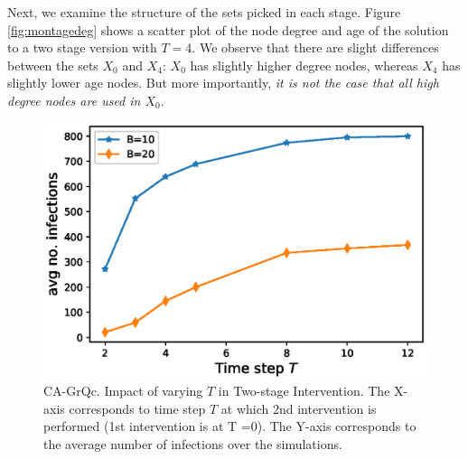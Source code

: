 Next, we examine the structure of the sets picked in each stage. Figure \ref{fig:montagedeg} shows a scatter plot of the node degree and age of the solution to a two stage version with $T=4$. We observe that there are slight differences between the sets $X_0$ and $X_4$: $X_0$ has slightly higher degree nodes, whereas $X_4$ has slightly lower age nodes. But more importantly, \emph{it is not the case that all high degree nodes are used in $X_0$}.
\begin{figure}[!h]
    \centering
    \includegraphics[scale = 0.55]{Figuresnew/twostage}
    \caption{CA-GrQc. Impact of varying $T$ in Two-stage Intervention. The X-axis corresponds to time step $T$ at which 2nd intervention is performed (1st intervention is at T =0). The Y-axis corresponds to the average number of infections over the simulations.}
    \label{fig:temporal}
\end{figure}

